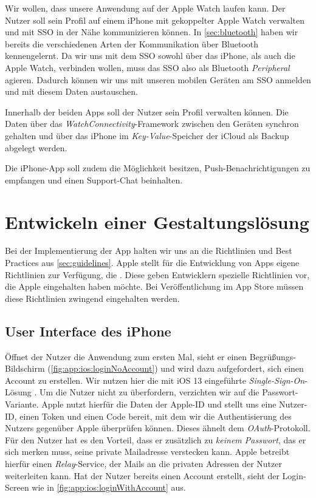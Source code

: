 Wir wollen, dass unsere Anwendung auf der Apple Watch laufen kann. Der Nutzer soll sein Profil auf einem iPhone mit gekoppelter Apple Watch verwalten und mit \ac{SSO} in der Nähe kommunizieren können. In \autoref{sec:bluetooth} haben wir bereits die verschiedenen Arten der Kommunikation über Bluetooth kennengelernt. Da wir uns mit dem \ac{SSO} sowohl über das iPhone, als auch die Apple Watch, verbinden wollen, muss das \ac{SSO} also als Bluetooth \emph{Peripheral} agieren. Dadurch können wir uns mit unseren mobilen Geräten am \ac{SSO} anmelden und mit diesem Daten austauschen.

Innerhalb der beiden Apps soll der Nutzer sein Profil verwalten können. Die Daten über das \emph{WatchConnectivity}-Framework zwischen den Geräten synchron gehalten und über das iPhone im \emph{Key-Value}-Speicher der iCloud als Backup abgelegt werden.

Die iPhone-App soll zudem die Möglichkeit besitzen, Push-Benachrichtigungen zu empfangen und einen Support-Chat beinhalten.

\section{Entwickeln einer Gestaltungslösung}

Bei der Implementierung der App halten wir uns an die Richtlinien und Best Practices aus \autoref{sec:guidelines}. Apple stellt für die Entwicklung von Apps eigene Richtlinien zur Verfügung, die  \cite{Apple::Human-Interface-Guidelines}. Diese geben Entwicklern spezielle Richtlinien vor, die Apple eingehalten haben möchte. Bei Veröffentlichung im App Store müssen diese Richtlinien zwingend eingehalten werden.

\subsection{User Interface des iPhone}

Öffnet der Nutzer die Anwendung zum ersten Mal, sieht er einen Begrüßungs-Bildschirm (\autoref{fig:app:ios:loginNoAccount}) und wird dazu aufgefordert, sich einen Account zu erstellen. Wir nutzen hier die mit iOS 13 eingeführte \emph{Single-Sign-On}-Lösung . Um die Nutzer nicht zu überfordern, verzichten wir auf die  Passwort-Variante. Apple nutzt hierfür die Daten der Apple-ID und stellt uns eine Nutzer-ID, einen Token und einen Code bereit, mit dem wir die Authentisierung des Nutzers gegenüber Apple überprüfen können. Dieses ähnelt dem \emph{OAuth}-Protokoll. Für den Nutzer hat es den Vorteil, dass er zusätzlich zu \emph{keinem Passwort}, das er sich merken muss, seine private Mailadresse verstecken kann. Apple betreibt hierfür einen \emph{Relay}-Service, der Mails an die privaten Adressen der Nutzer weiterleiten kann. Hat der Nutzer bereits einen Account erstellt, sieht der Login-Screen wie in \autoref{fig:app:ios:loginWithAccount} aus.

